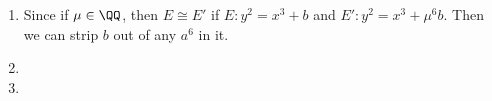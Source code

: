 \begin{enumerate}[label=\ilabel]
    \item 
        Since if $\mu \in \QQ$, then $E \cong E'$ if $E : y^2 = x^3 + b$ and $E': y^2 = x^3 + \mu^6 b$. Then we can strip $b$ out of any $a^6$ in it.
    
    \item 
    
    \item 
\end{enumerate}